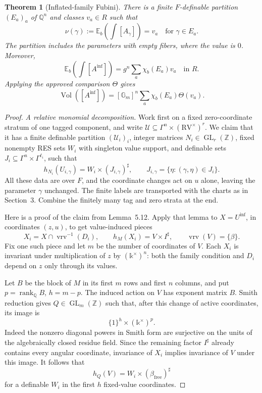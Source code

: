 \documentclass[12pt]{amsart}
\theoremstyle{remark}
\theoremstyle{definition}
\newcommand{\Q}{\mathds{Q}}
\newcommand{\RV}{\mathrm{RV}}
\newcommand{\K}{\mathds{k}}
\newcommand{\Z}{\mathds{Z}}
\newcommand{\vrv}{\operatorname{vrv}}
\newcommand{\GL}{\operatorname{GL}}
\numberwithin{equation}{section}
\newcommand{\Gm}{\mathbb G_m}
\newcommand{\E}{\mathbb E_b}
\newcommand{\Vol}{\operatorname{Vol}}
\theoremstyle{plain}
\newtheorem*{thm*}{Theorem}
\begin{document}
{\color{ProposalOrange}
\begin{thm*}[Inflated-family Fubini]
There is a finite $F$-definable partition $(E_a)_a$ of $\Q^n$
and classes $v_a\in R$ such that
\begin{equation}\label{trop:fub:cons}
 \nu(\gamma):=\E\!\left(\int[A_\gamma]\right)=v_a
 \quad\text{for }\gamma\in E_a.
\end{equation}
The partition includes the parameters with empty fibers, where
the value is $0$. Moreover,
\begin{equation}\label{fubini:inflated:RES}
 \E\!\left(\int[A^{\mathrm{inf}}]\right)
   =g^n\sum_a\chi_b(E_a)v_a\quad\text{in }R.
\end{equation}
Applying the approved comparison $\Theta$ gives
\[
 \Vol([A^{\mathrm{inf}}])
   =[\Gm]^n\sum_a\chi_b(E_a)\Theta(v_a).
\]
\end{thm*}

\begin{proof}
\emph{A relative monomial decomposition.}
Work first on a fixed zero-coordinate stratum of one tagged
component, and write
$\mathcal U\subseteq\Gamma^n\times(\RV^\times)^r$.
We claim that it has a finite definable partition
$(\mathcal U_i)_i$, integer matrices $N_i\in\GL_r(\Z)$,
fixed nonempty RES sets $W_i$ with singleton value support,
and definable sets
$J_i\subseteq\Gamma^n\times\Gamma^{\ell_i}$, such that
\begin{equation}\label{relative:monomial:chart}
 h_{N_i}(U_{i,\gamma})
       =W_i\times(J_{i,\gamma})^\sharp,\qquad
 J_{i,\gamma}=\{\eta:(\gamma,\eta)\in J_i\}.
\end{equation}
All these data are over $F$, and the coordinate changes act on
$u$ alone, leaving the parameter $\gamma$ unchanged.
The finite labels are transported with the charts as in
Section~3. Combine the finitely many tag and zero strata at
the end.

Here is a proof of the claim from Lemma~5.12.
Apply that lemma to $X=U^{\mathrm{inf}}$, in coordinates
$(z,u)$, to get value-induced pieces
\[
 X_i=X\cap\vrv^{-1}(D_i),\qquad
 h_M(X_i)=V\times I^\sharp,\qquad \vrv(V)=\{\beta\}.
\]
Fix one such piece and let $m$ be the number of coordinates of
$V$. Each $X_i$ is invariant under multiplication of $z$ by
$(\K^\times)^n$: both the family condition and $D_i$
depend on $z$ only through its values.

Let $B$ be the block of $M$ in its first $m$ rows and first
$n$ columns, and put $p=\operatorname{rank}_{\Q}B$,
$h=m-p$. The induced action on $V$ has exponent matrix $B$.
Smith reduction gives $Q\in\GL_m(\Z)$ such that, after this
change of active coordinates, its image is
\[
 \{1\}^h\times(\K^\times)^p.
\]
Indeed the nonzero diagonal powers in Smith form are
surjective on the units of the algebraically closed residue
field. Since the remaining factor $I^\sharp$ already contains
every angular coordinate, invariance of $X_i$ implies
invariance of $V$ under this image. It follows that
\[
 h_Q(V)=W_i\times(\beta_{\mathrm{free}})^\sharp
\]
for a definable $W_i$ in the first $h$ fixed-value
coordinates.


\end{proof}}
\end{document}
